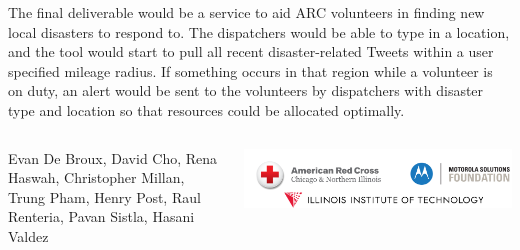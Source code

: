 \documentclass
[
blockverticalspace=-0.8cm
]
{tikzposter}
\begin{document}
\begin{columns}

	{
        \fontsize{36pt}{14pt}\selectfont
    	The final deliverable would be a service to aid ARC volunteers in finding new local disasters to respond to. The dispatchers would be able to type in a location, and the tool would start to pull all recent disaster-related Tweets within a user specified mileage radius. If something occurs in that region while a volunteer is on duty, an alert would be sent to the volunteers by dispatchers with disaster type and location so that resources could be allocated optimally.  
	}
	
\end{columns}



\begin{columns}


        {
            Evan De Broux,
            David Cho,
            Rena Haswah, 
            Christopher Millan,
            Trung Pham, 
            Henry Post, 
            Raul Renteria, 
            Pavan Sistla, 
            Hasani Valdez
        }
    
    \block{}
    {
        \vspace{-1cm}
        \includegraphics[scale=.5]{Logos.png}
    }
    
\end{columns}
\end{document}
